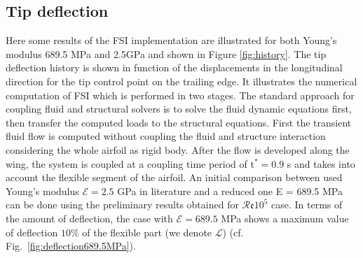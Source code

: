 \documentclass[conf]{new-aiaa}
\newcommand{\Rey}{\mathcal{R}\mathfrak{e}}
\begin{document}
\subsection{Tip deflection}
\label{sec:deflection}
Here some results of the FSI implementation are illustrated for both Young's modulus 689.5 MPa and 2.5GPa and shown in Figure \ref{fig:history}.
%
The tip deflection history is shown in function of the displacements in the longitudinal direction for the tip control point on the trailing edge.
%
It illustrates the numerical computation of FSI which is performed in two stages.
%
The standard approach for coupling fluid and structural solvers is to solve the fluid dynamic equations first, then transfer the computed loads to the structural equations.
%
First the transient fluid flow is computed without coupling the fluid and structure interaction considering the whole airfoil as rigid body.
%
After the flow is developed along the wing, the system is coupled at a coupling time period of t$^*=0.9$ s and takes into account the flexible segment of the airfoil.
%
An initial comparison between used Young's modulus $\mathcal{E}=2.5$ GPa in literature and  a reduced one E = 689.5 MPa can be done using the preliminary results obtained for $\Rey10^5$ case.
%
In terms of the amount of deflection, the case with $\mathcal{E}=689.5$ MPa shows a maximum value of deflection $10\%$ of the flexible part (we denote $\mathcal{L}$) (cf. Fig.~\ref{fig:deflection689.5MPa}).
%
\end{document}
